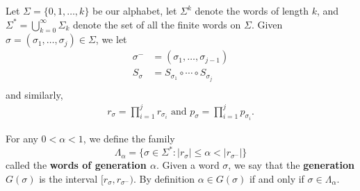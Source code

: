 \documentclass[11pt, a4paper]{memoir}
\newcommand{\mbf}[1]{{\boldmath\bfseries #1}}
\theoremstyle{change}
\theoremstyle{plain}
\theoremstyle{nonumberplain}
\numberwithin{equation}{section}
\begin{document}
Let $\Sigma=\{0,1,\ldots,k\}$ be our alphabet, let $\Sigma^k$ denote the words of length $k$, and $\Sigma^*=\bigcup_{k=0}^\infty\Sigma_k$ denote the set of all the finite words on $\Sigma$.
Given $\sigma=(\sigma_1,\ldots,\sigma_j)\in\Sigma$, we let
\begin{align*}
    \sigma^- &=(\sigma_1,\ldots,\sigma_{j-1})\\
    S_\sigma &= S_{\sigma_1}\circ\cdots\circ S_{\sigma_j}\\
\end{align*}
and similarly,
\begin{align*}
    r_\sigma = \prod_{i=1}^j r_{\sigma_i}\text{ and }p_\sigma = \prod_{i=1}^j p_{\sigma_i}.
\end{align*}

For any $0<\alpha<1$, we define the family
\begin{equation*}
    \Lambda_\alpha=\{\sigma\in\Sigma^*:|r_\sigma|\leq\alpha<|r_{\sigma^-}|\}
\end{equation*}
called the \mbf{words of generation $\alpha$}.
Given a word $\sigma$, we say that the \textbf{generation} $G(\sigma)$ is the interval $[r_\sigma,r_{\sigma^-})$.
By definition $\alpha\in G(\sigma)$ if and only if $\sigma\in\Lambda_\alpha$.
\end{document}
